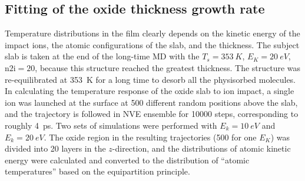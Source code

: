 \documentclass[manuscript=cmatex]{achemso}
\begin{document}
\subsection{Fitting of the oxide thickness growth rate}
Temperature distributions in the film clearly depends on the kinetic energy of the impact ions, the atomic configurations of the slab, and the thickness. The subject slab is taken at the end of the long-time MD with the $T_s=\SI{353}{K}$, $E_K=\SI{20}{eV}$, $\mathrm{n2i}=20$, because this structure reached the greatest thickness. The structure was re-equilibrated at \SI{353}{K} for a long time to desorb all the physisorbed  molecules. In calculating the temperature response of the oxide slab to ion impact, a single ion was launched at the surface at 500 different random positions above the slab, and the trajectory is followed in NVE ensemble for 10000 steps, corresponding to roughly \SI{4}{ps}. Two sets of simulations were performed with $E_k=\SI{10}{eV}$ and $E_k=\SI{20}{eV}$. The oxide region in the resulting trajectories (500 for one $E_K$) was divided into 20 layers in the $z$-direction, and the distributions of atomic kinetic energy were calculated and converted to the distribution of ``atomic temperatures'' based on the equipartition principle. 
\clearpage


\end{document}
